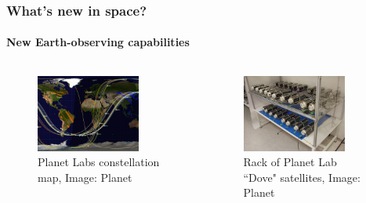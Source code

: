 \documentclass{beamer}
\begin{document}
\begin{frame}
  \frametitle{What's new in space?}
  \framesubtitle{New Earth-observing capabilities}

  \begin{columns}[t]

    \begin{column}{5cm}
      \begin{figure}
        \includegraphics[width=0.8\textwidth]{images/planetlabs_orbit_operations.jpg}
        \caption{Planet Labs constellation map, Image: Planet}
        \label{fig:space_segment}
      \end{figure}
    \end{column}

    \begin{column}{5cm}
      \begin{figure}
        \includegraphics[width=0.8\textwidth]{images/planetlabs_satellites.jpg}
        \caption{Rack of Planet Lab ``Dove" satellites, Image: Planet}
        \label{fig:space_segment}
      \end{figure}
    \end{column}
  \end{columns}
\end{frame}
\end{document}
